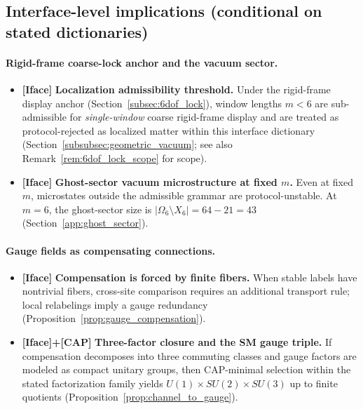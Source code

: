 \subsection{Interface-level implications (conditional on stated dictionaries)}
\paragraph{Rigid-frame coarse-lock anchor and the vacuum sector.}
\begin{itemize}
\item \textbf{[Iface]} \textbf{Localization admissibility threshold.}
Under the rigid-frame display anchor (Section~\ref{subsec:6dof_lock}), window lengths $m<6$ are sub-admissible for \emph{single-window} coarse rigid-frame display and are treated as protocol-rejected as localized matter within this interface dictionary (Section~\ref{subsubsec:geometric_vacuum}; see also Remark~\ref{rem:6dof_lock_scope} for scope).
\item \textbf{[Iface]} \textbf{Ghost-sector vacuum microstructure at fixed $m$.}
Even at fixed $m$, microstates outside the admissible grammar are protocol-unstable.
At $m=6$, the ghost-sector size is $|\Omega_6\setminus X_6|=64-21=43$ (Section~\ref{app:ghost_sector}).
\end{itemize}

\paragraph{Gauge fields as compensating connections.}
\begin{itemize}
\item \textbf{[Iface]} \textbf{Compensation is forced by finite fibers.}
When stable labels have nontrivial fibers, cross-site comparison requires an additional transport rule; local relabelings imply a gauge redundancy (Proposition~\ref{prop:gauge_compensation}).
\item \textbf{[Iface]+[CAP]} \textbf{Three-factor closure and the SM gauge triple.}
If compensation decomposes into three commuting classes and gauge factors are modeled as compact unitary groups, then CAP-minimal selection within the stated factorization family yields $U(1)\times SU(2)\times SU(3)$ up to finite quotients (Proposition~\ref{prop:channel_to_gauge}).
\end{itemize}


